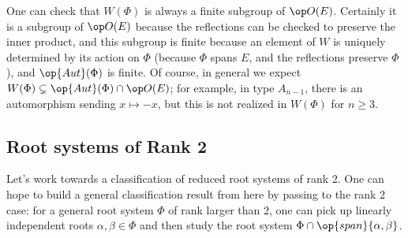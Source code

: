 \documentclass[../notes.tex]{subfiles}
\begin{document}
\begin{remark}
	One can check that $W(\Phi)$ is always a finite subgroup of $\op O(E)$. Certainly it is a subgroup of $\op O(E)$ because the reflections can be checked to preserve the inner product, and this subgroup is finite because an element of $W$ is uniquely determined by its action on $\Phi$ (because $\Phi$ spans $E$, and the reflections preserve $\Phi$), and $\op{Aut}(\Phi)$ is finite. Of course, in general we expect $W(\Phi)\subsetneq\op{Aut}(\Phi)\cap\op O(E)$; for example, in type $A_{n-1}$, there is an automorphism sending $x\mapsto-x$, but this is not realized in $W(\Phi)$ for $n\ge3$.
\end{remark}

\subsection{Root systems of Rank 2}
Let's work towards a classification of reduced root systems of rank $2$. One can hope to build a general classification result from here by passing to the rank $2$ case: for a general root system $\Phi$ of rank larger than $2$, one can pick up linearly independent roots $\alpha,\beta\in\Phi$ and then study the root system $\Phi\cap\op{span}\{\alpha,\beta\}$.
\end{document}
